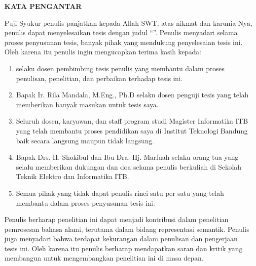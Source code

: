 \clearpage

\begin{center}
  \textbf{\large KATA PENGANTAR}\\[3em]
\end{center}

Puji Syukur penulis panjatkan kepada Allah SWT, atas nikmat dan karunia-Nya, penulis dapat menyelesaikan tesis dengan judul ``\textit{\Title}''. Penulis menyadari selama proses penyusunan tesis, banyak pihak yang mendukung penyelesaian tesis ini. Oleh karena itu penulis ingin mengucapkan terima kasih kepada:
\begin{enumerate}
  \item \SupervisorHonorific{} \SupervisorName{} selaku dosen pembimbing tesis penulis yang membantu dalam proses penulisan, penelitian, dan perbaikan terhadap tesis ini.
  \item Bapak Ir. Rila Mandala, M.Eng., Ph.D selaku dosen penguji tesis yang telah memberikan banyak masukan untuk tesis saya.
  \item Seluruh dosen, karyawan, dan staff program studi Magister Informatika ITB yang telah membantu proses pendidikan saya di Institut Teknologi Bandung baik secara langsung maupun tidak langsung.
  \item Bapak Drs. H. Shokibul dan Ibu Dra. Hj. Marfuah selaku orang tua yang selalu memberikan dukungan dan doa selama penulis berkuliah di Sekolah Teknik Elektro dan Informatika ITB.
  \item Semua pihak yang tidak dapat penulis rinci satu per satu yang telah membantu dalam proses penyusunan tesis ini.
\end{enumerate}

Penulis berharap penelitian ini dapat menjadi kontribusi dalam penelitian pemrosesan bahasa alami, terutama dalam bidang representasi semantik. Penulis juga menyadari bahwa terdapat kekurangan dalam penulisan dan pengerjaan tesis ini. Oleh karena itu penulis berharap mendapatkan saran dan kritik yang membangun untuk mengembangkan penelitian ini di masa depan.
